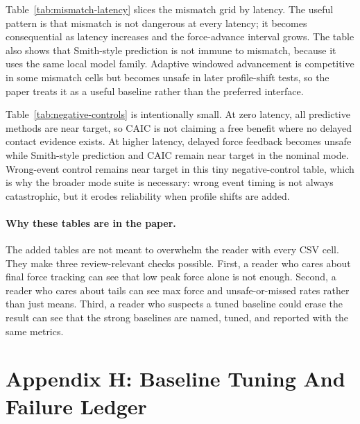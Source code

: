 \documentclass{article}
\newcommand{\caic}{CAIC}
\begin{document}
Table~\ref{tab:mismatch-latency} slices the mismatch grid by latency. The useful pattern is that mismatch is not dangerous at every latency; it becomes consequential as latency increases and the force-advance interval grows. The table also shows that Smith-style prediction is not immune to mismatch, because it uses the same local model family. Adaptive windowed advancement is competitive in some mismatch cells but becomes unsafe in later profile-shift tests, so the paper treats it as a useful baseline rather than the preferred interface.

\begin{table}[t]
    \centering
    \scriptsize
    \caption{Negative-control peak forces in Newtons. These runs verify that the implementation does not manufacture a benefit when latency is zero or when the event clock is intentionally wrong.}
    \label{tab:negative-controls}
    \resizebox{0.82\linewidth}{!}{}
\end{table}

Table~\ref{tab:negative-controls} is intentionally small. At zero latency, all predictive methods are near target, so \caic{} is not claiming a free benefit where no delayed contact evidence exists. At higher latency, delayed force feedback becomes unsafe while Smith-style prediction and \caic{} remain near target in the nominal mode. Wrong-event control remains near target in this tiny negative-control table, which is why the broader mode suite is necessary: wrong event timing is not always catastrophic, but it erodes reliability when profile shifts are added.

\paragraph{Why these tables are in the paper.}
The added tables are not meant to overwhelm the reader with every CSV cell. They make three review-relevant checks possible. First, a reader who cares about final force tracking can see that low peak force alone is not enough. Second, a reader who cares about tails can see max force and unsafe-or-missed rates rather than just means. Third, a reader who suspects a tuned baseline could erase the result can see that the strong baselines are named, tuned, and reported with the same metrics.

\clearpage
\section{Appendix H: Baseline Tuning And Failure Ledger}
\end{document}
